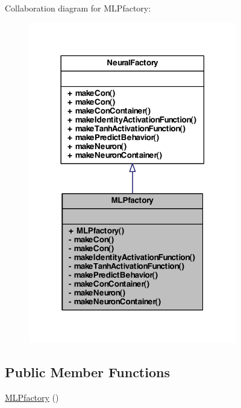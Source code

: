 Collaboration diagram for MLPfactory:
\nopagebreak
\begin{figure}[H]
\begin{center}
\leavevmode
\includegraphics[width=258pt]{class_m_l_pfactory__coll__graph}
\end{center}
\end{figure}
\subsection*{Public Member Functions}
\begin{DoxyCompactItemize}
\item 
\hyperlink{class_m_l_pfactory_a61dfce37d0344c58e275e8508b0a474c}{MLPfactory} ()
\end{DoxyCompactItemize}
